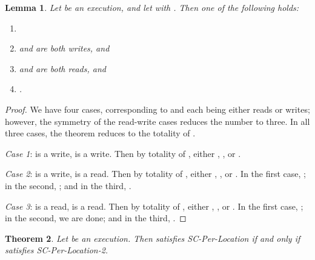 \documentclass[]{eptcs}
\newtheorem{theorem}{Theorem}[section]
\newtheorem{lemma}[theorem]{Lemma}
\begin{document}
\begin{lemma}\label{comp-total}
Let  be an execution, and let  with . Then one of the following holds:
\begin{enumerate}
  \item 
  \item  and  are both writes, and 
  \item  and  are both reads, and 
  \item .
\end{enumerate}
\end{lemma}
\begin{proof}
We have four cases, corresponding to  and  each being either reads or writes; however, the symmetry of the read-write cases reduces the number to three. In all three cases, the theorem reduces to the totality of .

\emph{Case 1}:  is a write,  is a write. Then by totality of , either , , or .

\emph{Case 2}:  is a write,  is a read. Then by totality of , either , , or . In the first case, ; in the second, ; and in the third, .

\emph{Case 3}:  is a read,  is a read. Then by totality of , either , , or . In the first case, ; in the second, we are done; and in the third, .
\end{proof}

\begin{theorem}
Let  be an execution. Then  satisfies SC-Per-Location if and only if  satisfies SC-Per-Location-2.
\end{theorem}
\end{document}
